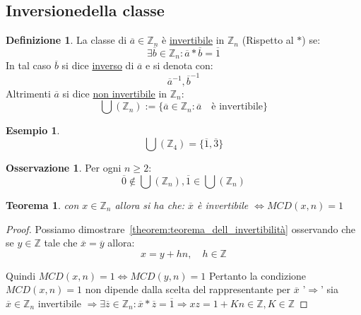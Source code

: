 \documentclass{article}
\newtheorem{exmp}{Esempio}[section]
\newtheorem{theorem}{Teorema}[section]
\theoremstyle{definition}
\newtheorem{definition}{Definizione}[section]
\newtheorem{oss}{Osservazione}[section]
\begin{document}
\subsection{Inversionedella classe}
\begin{definition}
        La classe di $\overline{a} \in \mathbb{Z}_n$ è \underline{invertibile} in $ \mathbb{Z}_n $ (Rispetto al $*$) se:
        \begin{equation*}
                \exists \overline{b} \in \mathbb{Z}_n : \overline{a} * \overline{b} = \overline{1}
        \end{equation*}
        In tal caso $\overline{b}$ si dice \underline{inverso} di $\overline{a}$ e si denota con:
        \begin{equation*}
                \overline{a}^{-1}, \overline{b}^{-1}
        \end{equation*}
        Altrimenti $\overline{a}$ si dice \underline{non invertibile} in $\mathbb{Z}_n$:
        \begin{equation*}
                \bigcup(\mathbb{Z}_n) := \{\overline{a} \in \mathbb{Z}_n : \overline{a} \quad \mbox{è invertibile}\} 
        \end{equation*}
\end{definition}


\begin{exmp}
        \begin{equation*}
                \bigcup(\mathbb{Z}_4) = \{\overline{1}, \overline{3}\}
        \end{equation*} 
\end{exmp}


\begin{oss}
        Per ogni $n \ge 2$:
        \begin{equation*}
                \overline{0} \not \in \bigcup(\mathbb{Z}_n), \overline{1} \in \bigcup(\mathbb{Z}_n)
        \end{equation*}

\end{oss}

\begin{theorem}
        con $x \in \mathbb{Z}_n$ allora si ha che:\newline
        $ \overline{x} $ è invertibile $\Leftrightarrow MCD(x,n) = 1$
\end{theorem}

\begin{proof}
       Possiamo dimostrare~\ref{theorem:teorema_dell_invertibilità} osservando che se $y \in \mathbb{Z}$ tale che $\overline{x} = \overline{y}$ allora:
       \begin{equation*}
               x = y + hn, \quad h \in \mathbb{Z}
       \end{equation*}

       Quindi $MCD(x,n) = 1 \Leftrightarrow MCD(y,n) = 1$
       Pertanto la condizione $MCD(x,n) = 1$ non dipende dalla scelta del rappresentante per $\overline{x}$ \newline
       '$\Rightarrow$' sia $\overline{x} \in \mathbb{Z}_n$ invertibile $ \Rightarrow \exists \overline{z} \in \mathbb{Z}_n : \overline{x} * \overline{z} = \overline{1} \Rightarrow xz = 1 + Kn \in \mathbb{Z}, K \in \mathbb{Z}$
\end{proof}
\end{document}
